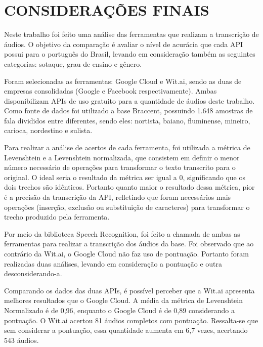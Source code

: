 \chapter[CONSIDERAÇÕES FINAIS]{CONSIDERAÇÕES FINAIS}


Neste trabalho foi feito uma análise das ferramentas que realizam a transcrição de áudios. O objetivo da comparação é avaliar o nível de acurácia que cada API possui para o português do Brasil, levando em consideração também as seguintes categorias: sotaque, grau de ensino e gênero. 


Foram selecionadas as ferramentas: Google Cloud e Wit.ai, sendo as duas de empresas consolidadas (Google e Facebook respectivamente). Ambas disponibilizam APIs de uso gratuito para a quantidade de áudios deste trabalho. Como fonte de dados foi utilizado a base Braccent, possuindo 1.648 amostras de fala divididos entre diferentes, sendo eles: nortista, baiano, fluminense, mineiro, carioca, nordestino e sulista. 

Para realizar a análise de acertos de cada ferramenta, foi utilizada a métrica de Levenshtein e a Levenshtein normalizada, que consistem em definir o menor número necessário de operações para transformar o texto transcrito para o original. O ideal seria o resultado da métrica ser igual a 0, significando  que os dois trechos são idênticos. Portanto quanto maior o resultado dessa métrica, pior é a precisão da transcrição da API, refletindo que foram necessários mais operações (inserção, exclusão ou substituição de caracteres) para transformar o trecho produzido pela ferramenta.


Por meio da biblioteca Speech Recognition, foi feito a chamada de ambas as ferramentas para realizar a transcrição dos áudios da base. Foi observado que ao contrário da Wit.ai, o Google Cloud não faz uso de pontuação. Portanto foram realizadas duas análises, levando em consideração a pontuação e outra desconsiderando-a. 



Comparando os dados das duas APIs, é possível perceber que a Wit.ai apresenta melhores resultados que o Google Cloud. A média da métrica de Levenshtein Normalizado é de 0,96, enquanto o Google Cloud é de 0,89 considerando a pontuação. O Wit.ai acertou 81 áudios completos com pontuação. Ressalta-se que sem considerar a pontuação, essa quantidade aumenta em 6,7 vezes, acertando 543 áudios.

